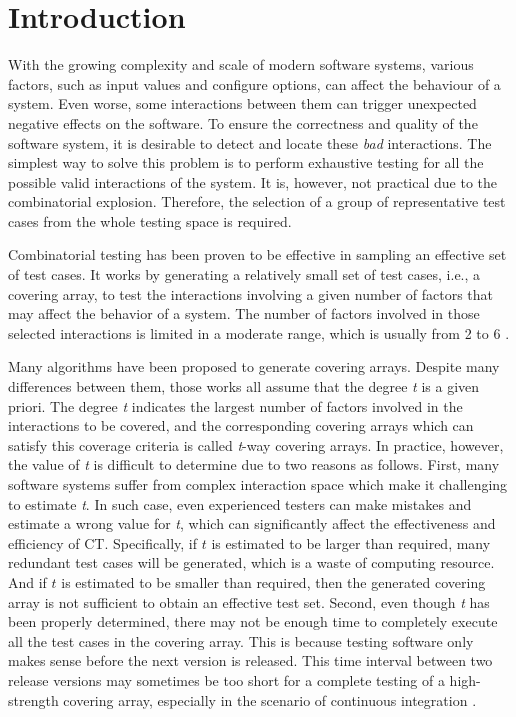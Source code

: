 \documentclass[conference]{IEEEtran}
\theoremstyle{definition}
\begin{document}
\section{Introduction}
With the growing complexity and scale of modern software systems, various factors, such as input values and configure options, can affect the behaviour of a system. Even worse, some interactions between them can trigger unexpected negative effects on the software. To ensure the correctness and quality of the software system, it is desirable to detect and locate these \emph{bad} interactions. The simplest way to solve this problem is to perform exhaustive testing for all the possible valid interactions of the system. It is, however, not practical due to the combinatorial explosion. Therefore, the selection of a group of representative test cases from the whole testing space is required.

Combinatorial testing has been proven to be effective in sampling an effective set of test cases\cite{nie2011survey}. It works by generating a relatively small set of test cases, i.e., a covering array, to test the interactions involving a given number of factors that may affect the behavior of a system. The number of factors involved in those selected interactions is limited in a moderate range, which is usually from 2 to 6 \cite{kuhn2002investigation}.


Many algorithms have been proposed to generate covering arrays. Despite many differences between them,  those works all assume that the degree \emph{t} is a given priori.  The degree \emph{t} indicates the largest number of factors involved in the interactions to be covered, and the corresponding covering arrays which can satisfy this coverage criteria is called \emph{t}-way covering arrays. In practice, however, the value of \emph{t} is difficult to determine due to two reasons as follows. First, many software systems suffer from complex interaction space which make it challenging to estimate \emph{t}. In such case, even experienced testers can make mistakes and estimate a wrong value for \emph{t}, which can significantly affect the effectiveness and efficiency of CT. Specifically, if $t$ is estimated to be larger than required, many redundant test cases will be generated, which is a waste of computing resource. And if $t$ is estimated to be smaller than required, then the generated covering array is not sufficient to obtain an effective test set. Second, even though \emph{t} has been properly determined, there may not be enough time to completely execute all the test cases in the covering array. This is because testing software only makes sense before the next version is released. This time interval between two release versions may sometimes be too short for a complete testing of a high-strength covering array, especially in the scenario of continuous integration \cite{fouche2009incremental}.
\end{document}
